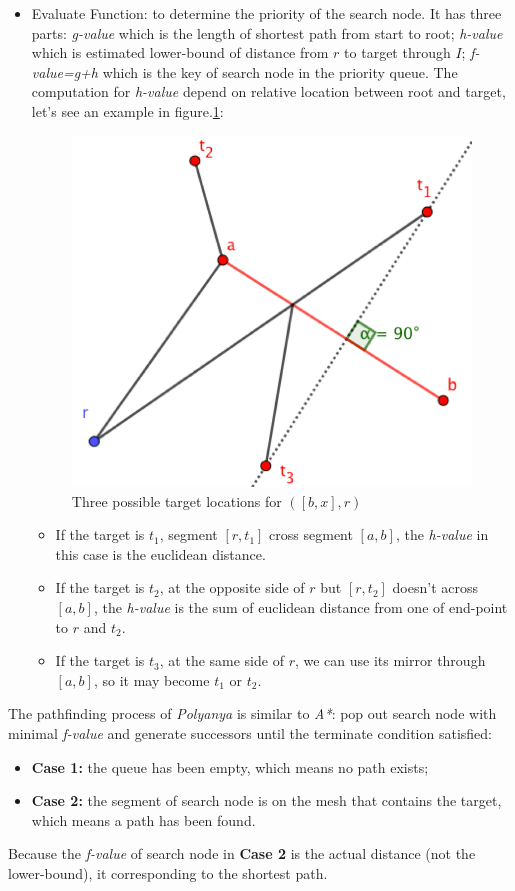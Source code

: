 \begin{itemize}
  \item Evaluate Function: to determine the priority of the search node. It has three parts:
    \textit{g-value} which is the length of shortest path from start to root;
    \textit{h-value} which is estimated lower-bound of distance from $r$ to target through $I$;
    \textit{f-value=g+h} which is the key of search node in the priority queue. The computation for
    \textit{h-value} depend on relative location between root and target, let's see an example in
    figure.\ref{ef}:

    \begin{figure}[htp]
      \centering
      \includegraphics[width=.4\linewidth]{pic/ef.png}
      \caption{Three possible target locations for $([b,x],r)$}
      \label{ef}
    \end{figure}

    \begin{itemize}
      \item If the target is $t_1$, segment $[r, t_1]$ cross segment $[a,b]$, the
        \textit{h-value} in this case is the euclidean distance.
      \item If the target is $t_2$, at the opposite side of $r$ but $[r, t_2]$ doesn't across
        $[a,b]$, the \textit{h-value} is the sum of euclidean distance from one of end-point to $r$
        and $t_2$.
      \item If the target is $t_3$, at the same side of $r$, we can use its mirror through
        $[a,b]$, so it may become $t_1$ or $t_2$.
    \end{itemize}
\end{itemize}
The pathfinding process of \textit{Polyanya} is similar to \textit{A*}: pop out search node with minimal
\textit{f-value} and generate successors until the terminate condition satisfied:
\begin{itemize}
  \item \textbf{Case 1:} the queue has been empty, which means no path exists;
  \item \textbf{Case 2:} the segment of search node is on the mesh that contains the target,
    which means a path has been found.
\end{itemize}
Because the \textit{f-value} of search node in \textbf{Case 2} is the actual distance (not
the lower-bound), it corresponding to the shortest path.

